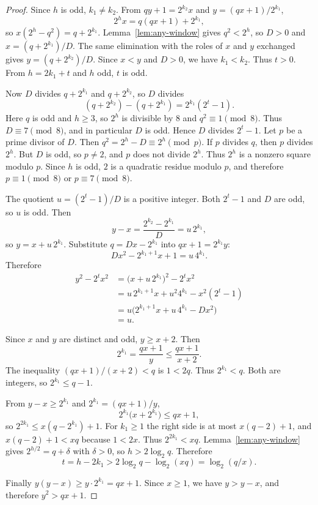 \documentclass[11pt]{article}
\begin{document}
\begin{proof}
Since $h$ is odd, $k_1 \ne k_2$.
From $qy + 1 = 2^{k_2} x$ and $y = (qx + 1)/2^{k_1}$,
\[
2^h x = q(qx + 1) + 2^{k_1},
\]
so $x(2^h - q^2) = q + 2^{k_1}$.
Lemma~\ref{lem:any-window} gives $q^2 < 2^h$, so $D > 0$ and $x = (q + 2^{k_1})/D$.
The same elimination with the roles of $x$ and $y$ exchanged gives $y = (q + 2^{k_2})/D$.
Since $x < y$ and $D > 0$, we have $k_1 < k_2$.
Thus $t > 0$.
From $h = 2k_1 + t$ and $h$ odd, $t$ is odd.

Now $D$ divides $q + 2^{k_1}$ and $q + 2^{k_2}$, so $D$ divides
\[
(q + 2^{k_2}) - (q + 2^{k_1}) = 2^{k_1}(2^t - 1).
\]
Here $q$ is odd and $h \ge 3$, so $2^h$ is divisible by $8$ and $q^2 \equiv 1 \pmod{8}$.
Thus $D \equiv 7 \pmod{8}$, and in particular $D$ is odd.
Hence $D$ divides $2^t - 1$.
Let $p$ be a prime divisor of $D$.
Then $q^2 = 2^h - D \equiv 2^h \pmod{p}$.
If $p$ divides $q$, then $p$ divides $2^h$.
But $D$ is odd, so $p \ne 2$, and $p$ does not divide $2^h$.
Thus $2^h$ is a nonzero square modulo $p$.
Since $h$ is odd, $2$ is a quadratic residue modulo $p$, and therefore $p \equiv 1 \pmod{8}$ or $p \equiv 7 \pmod{8}$.

The quotient $u = (2^t - 1)/D$ is a positive integer.
Both $2^t - 1$ and $D$ are odd, so $u$ is odd.
Then
\[
y - x = \frac{2^{k_2} - 2^{k_1}}{D} = u\, 2^{k_1},
\]
so $y = x + u\, 2^{k_1}$.
Substitute $q = Dx - 2^{k_1}$ into $qx + 1 = 2^{k_1} y$:
\[
D x^2 - 2^{k_1 + 1} x + 1 = u\, 4^{k_1}.
\]
Therefore
\begin{align*}
y^2 - 2^t x^2
&= \bigl(x + u\, 2^{k_1}\bigr)^2 - 2^t x^2 \\
&= u\, 2^{k_1 + 1} x + u^2 4^{k_1} - x^2(2^t - 1) \\
&= u\bigl(2^{k_1 + 1} x + u\, 4^{k_1} - D x^2\bigr) \\
&= u.
\end{align*}

Since $x$ and $y$ are distinct and odd, $y \ge x + 2$.
Then
\[
2^{k_1} = \frac{qx + 1}{y} \le \frac{qx + 1}{x + 2}.
\]
The inequality $(qx + 1)/(x + 2) < q$ is $1 < 2q$.
Thus $2^{k_1} < q$.
Both are integers, so $2^{k_1} \le q - 1$.

From $y - x \ge 2^{k_1}$ and $2^{k_1} = (qx + 1)/y$,
\[
2^{k_1}\bigl(x + 2^{k_1}\bigr) \le qx + 1,
\]
so $2^{2k_1} \le x(q - 2^{k_1}) + 1$.
For $k_1 \ge 1$ the right side is at most $x(q - 2) + 1$, and $x(q - 2) + 1 < xq$ because $1 < 2x$.
Thus $2^{2k_1} < xq$.
Lemma~\ref{lem:any-window} gives $2^{h/2} = q + \delta$ with $\delta > 0$, so $h > 2\log_2 q$.
Therefore
\[
t = h - 2k_1 > 2\log_2 q - \log_2(xq) = \log_2(q/x).
\]

Finally $y(y - x) \ge y \cdot 2^{k_1} = qx + 1$.
Since $x \ge 1$, we have $y > y - x$, and therefore $y^2 > qx + 1$.
\end{proof}
\end{document}
